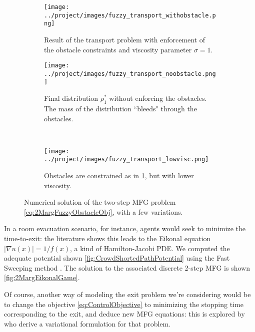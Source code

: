 \documentclass[../report.tex]{subfiles}
\begin{document}
\begin{figure}[h]
	\centering
	\begin{subfigure}[t]{.70\linewidth}
	\texttt{[image: ../project/images/fuzzy\_transport\_withobstacle.png]}
	\caption{Result of the transport problem with enforcement of the obstacle constraints and viscosity parameter $\sigma=1$.}\label{fig:2MargFuzzyTransportObstacles}
	\end{subfigure}
	\begin{subfigure}[t]{.34\linewidth}
	\centering
	\texttt{[image: ../project/images/fuzzy\_transport\_noobstacle.png]}
	\caption{Final distribution $\rho^*_1$ without enforcing the obstacles. The mass of the distribution ``bleeds" through the obstacles. }\label{fig:2MargFuzzyTransportRelaxedObst}
	\end{subfigure}~
	\begin{subfigure}[t]{.34\linewidth}
	\centering
	\texttt{[image: ../project/images/fuzzy\_transport\_lowvisc.png]}
	\caption{Obstacles are constrained as in \cref{fig:2MargFuzzyTransportObstacles}, but with lower viscosity.}\label{fig:2MargFuzzyTransportLowVisc}
	\end{subfigure}
	\caption{Numerical solution of the two-step MFG problem \eqref{eq:2MargFuzzyObstacleObj}, with a few variations.}\label{fig:2MargFuzzyTransportMarginals}
\end{figure}

\begin{remark}\label{rem:SmartPotential}
In a room evacuation scenario, for instance, agents would seek to minimize the time-to-exit: the literature shows this leads to the Eikonal equation $|\nabla u(x)| = 1/f(x)$, a kind of Hamilton-Jacobi PDE. We computed the adequate potential shown \cref{fig:CrowdShortedPathPotential} using the Fast Sweeping method \parencite{Zhao2004AFS}. The solution to the associated discrete 2-step MFG is shown \cref{fig:2MargEikonalGame}.

Of course, another way of modeling the exit problem we're considering would be to change the objective \eqref{eq:ControlObjective} to minimizing the stopping time corresponding to the exit, and deduce new MFG equations: this is explored by \textcite{benamou:hal-01295299} who derive a variational formulation for that problem.
\end{remark}
\end{document}
